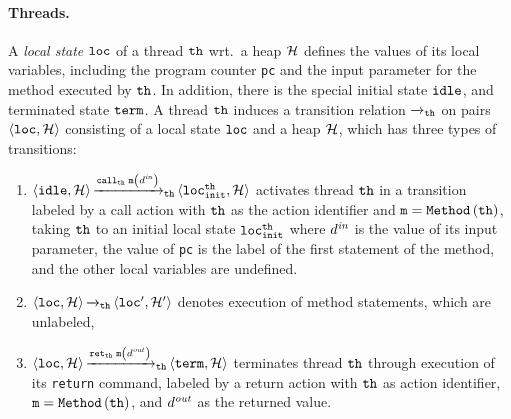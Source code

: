 \paragraph{Threads.}
A {\it local state} ${\tt loc}$ of a thread ${\tt th}$
wrt.\ a heap ${\mathcal H}$ defines 
the values of its local variables, including the program counter
{\tt pc} and the input parameter for the method executed by ${\tt th}$.
In addition, there is the special initial state ${\tt idle}$,
and terminated state ${\tt term}$.
%
%
A thread ${\tt th}$ induces a transition relation ${\xrightarrow{}{}}_{\!\!{\tt th}}$
on pairs $\left\langle{\tt loc},{\mathcal H}\right\rangle$ consisting of a local state
${\tt loc}$ and a heap ${\mathcal H}$, which
has three types of transitions:
%
\begin{enumerate}
\item
$\left\langle{\tt idle},{\mathcal H}\right\rangle
{\xrightarrow{{\mathtt{call}_{{\tt th}}\; {\tt m}\left(d^{\it in}\right)}}{}}_{\!\!{\tt th}}
\left\langle{\tt loc}_{\tt init}^{{\tt th}},{\mathcal H}\right\rangle$ activates
thread ${\tt th}$ in a transition
labeled by a call action with ${\tt th}$ as the action identifier and
${\tt m}={\tt Method}\left({\tt th}\right)$, taking ${\tt th}$
to an initial local state ${\tt loc}_{\tt init}^{{\tt th}}$
where $d^{\it in}$ is the value of its input parameter,
the value of {\tt pc} is the label of the first statement of the method, and
the other local variables are undefined.
\item
$\left\langle{\tt loc},{\mathcal H}\right\rangle{\xrightarrow{}{}}_{\!\!{\tt th}}\left\langle{\tt loc}',{\mathcal H}'\right\rangle$
denotes execution of method statements, which are unlabeled,
%
%
\item 
$\left\langle{\tt loc},{\mathcal H}\right\rangle{\xrightarrow{\mathtt{ret}_{{\tt th}}\; {\tt m}\left(d^{\it out}\right)}{}}_{\!\!{\tt th}}
\left\langle{\tt term},{\mathcal H}\right\rangle$ terminates
thread ${\tt th}$ through execution of its {\tt return} command, labeled
by a return action with ${\tt th}$ as action identifier,
${\tt m}={\tt Method}\left({\tt th}\right)$, and $d^{\it out}$
as the returned value.
\end{enumerate}


